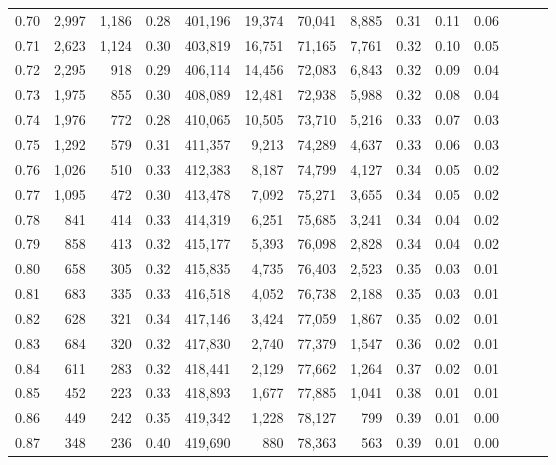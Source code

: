 \begin{tabular}{rrrrrrrrrrrrrr}
0.70 &   2,997 &  1,186 &  0.28 &  401,196 &   19,374 &  70,041 &   8,885 &  0.31 &  0.11 &      0.06 \\
0.71 &   2,623 &  1,124 &  0.30 &  403,819 &   16,751 &  71,165 &   7,761 &  0.32 &  0.10 &      0.05 \\
0.72 &   2,295 &    918 &  0.29 &  406,114 &   14,456 &  72,083 &   6,843 &  0.32 &  0.09 &      0.04 \\
0.73 &   1,975 &    855 &  0.30 &  408,089 &   12,481 &  72,938 &   5,988 &  0.32 &  0.08 &      0.04 \\
0.74 &   1,976 &    772 &  0.28 &  410,065 &   10,505 &  73,710 &   5,216 &  0.33 &  0.07 &      0.03 \\
0.75 &   1,292 &    579 &  0.31 &  411,357 &    9,213 &  74,289 &   4,637 &  0.33 &  0.06 &      0.03 \\
0.76 &   1,026 &    510 &  0.33 &  412,383 &    8,187 &  74,799 &   4,127 &  0.34 &  0.05 &      0.02 \\
0.77 &   1,095 &    472 &  0.30 &  413,478 &    7,092 &  75,271 &   3,655 &  0.34 &  0.05 &      0.02 \\
0.78 &     841 &    414 &  0.33 &  414,319 &    6,251 &  75,685 &   3,241 &  0.34 &  0.04 &      0.02 \\
0.79 &     858 &    413 &  0.32 &  415,177 &    5,393 &  76,098 &   2,828 &  0.34 &  0.04 &      0.02 \\
0.80 &     658 &    305 &  0.32 &  415,835 &    4,735 &  76,403 &   2,523 &  0.35 &  0.03 &      0.01 \\
0.81 &     683 &    335 &  0.33 &  416,518 &    4,052 &  76,738 &   2,188 &  0.35 &  0.03 &      0.01 \\
0.82 &     628 &    321 &  0.34 &  417,146 &    3,424 &  77,059 &   1,867 &  0.35 &  0.02 &      0.01 \\
0.83 &     684 &    320 &  0.32 &  417,830 &    2,740 &  77,379 &   1,547 &  0.36 &  0.02 &      0.01 \\
0.84 &     611 &    283 &  0.32 &  418,441 &    2,129 &  77,662 &   1,264 &  0.37 &  0.02 &      0.01 \\
0.85 &     452 &    223 &  0.33 &  418,893 &    1,677 &  77,885 &   1,041 &  0.38 &  0.01 &      0.01 \\
0.86 &     449 &    242 &  0.35 &  419,342 &    1,228 &  78,127 &     799 &  0.39 &  0.01 &      0.00 \\
0.87 &     348 &    236 &  0.40 &  419,690 &      880 &  78,363 &     563 &  0.39 &  0.01 &      0.00 \\

\end{tabular}
